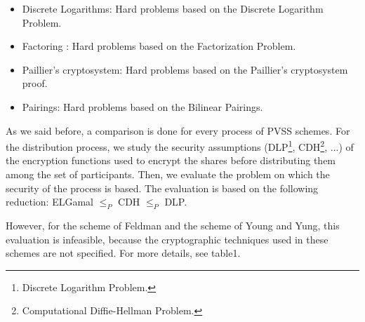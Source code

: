 \documentclass[submission,copyright,creativecommons]{eptcs}
\begin{document}
\begin{itemize}
\item Discrete Logarithms: Hard problems based on the Discrete Logarithm
Problem.
\item Factoring : Hard problems based on the Factorization Problem.
\item Paillier's cryptosystem: Hard problems based on the Paillier's
cryptosystem proof.
\item Pairings: Hard problems based on the Bilinear Pairings.
\end{itemize}

As we said before, a comparison is done for every process of PVSS
schemes. For the distribution process, we study the security assumptions (DLP\footnote{Discrete Logarithm Problem.}, CDH\footnote{Computational Diffie-Hellman Problem.}, ...) of the encryption functions
used to encrypt the shares before distributing them among the set of
participants. Then, we evaluate the problem on which the security of the
process is based. The evaluation is based on the following reduction:
ELGamal $\leq _{P}$ CDH $\leq _{P}$ DLP.

However, for the scheme of Feldman and the scheme of Young and Yung, this
evaluation is infeasible, because the cryptographic techniques used in these
schemes are not specified. For more details, see table1.
\end{document}
